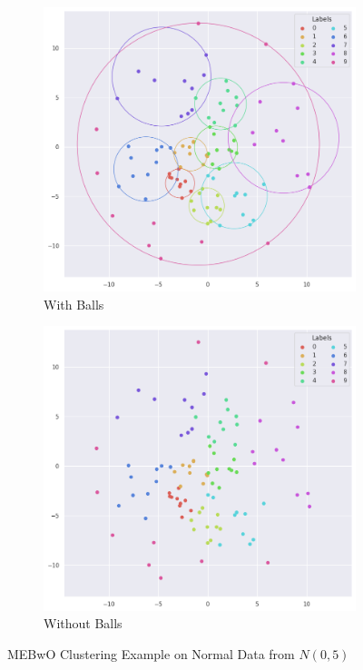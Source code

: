 \documentclass[11pt,twoside]{report}
\theoremstyle{definition}
\numberwithin{theorem}{section}
\numberwithin{definition}{section}
\numberwithin{lemma}{section}
\numberwithin{proposition}{section}
\numberwithin{equation}{section}
\numberwithin{figure}{section}
\begin{document}
\begin{figure}[ht]
    \centering
    \begin{subfigure}[b]{0.475\textwidth}
        \centering
        \includegraphics[width=\textwidth]{images/clustering/with_balls.png}
        \caption{With Balls}
    \end{subfigure}
    \hfill
    \begin{subfigure}[b]{0.475\textwidth}
        \centering
        \includegraphics[width=\textwidth]{images/clustering/no_balls.png}
        \caption{Without Balls}
    \end{subfigure}
    \caption{MEBwO Clustering Example on Normal Data from $N(0,5)$}
    \label{fig:clustering}
\end{figure}
\end{document}
